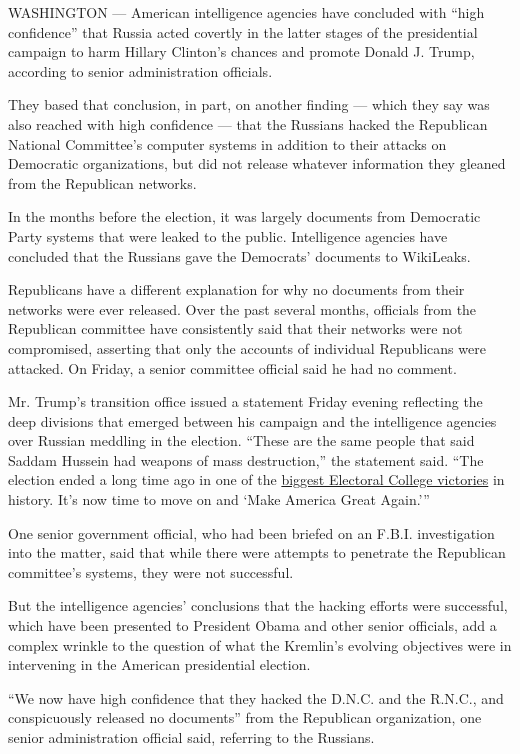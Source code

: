WASHINGTON --- American intelligence agencies have concluded with ``high
confidence'' that Russia acted covertly in the latter stages of the
presidential campaign to harm Hillary Clinton's chances and promote
Donald J. Trump, according to senior administration officials.

They based that conclusion, in part, on another finding --- which they
say was also reached with high confidence --- that the Russians hacked
the Republican National Committee's computer systems in addition to
their attacks on Democratic organizations, but did not release whatever
information they gleaned from the Republican networks.

In the months before the election, it was largely documents from
Democratic Party systems that were leaked to the public. Intelligence
agencies have concluded that the Russians gave the Democrats' documents
to WikiLeaks.

Republicans have a different explanation for why no documents from their
networks were ever released. Over the past several months, officials
from the Republican committee have consistently said that their networks
were not compromised, asserting that only the accounts of individual
Republicans were attacked. On Friday, a senior committee official said
he had no comment.

Mr. Trump's transition office issued a statement Friday evening
reflecting the deep divisions that emerged between his campaign and the
intelligence agencies over Russian meddling in the election. ``These are
the same people that said Saddam Hussein had weapons of mass
destruction,'' the statement said. ``The election ended a long time ago
in one of the
\href{http://www.politifact.com/wisconsin/statements/2016/nov/21/reince-priebus/despite-losing-popular-vote-donald-trump-won-elect/}{biggest
Electoral College victories} in history. It's now time to move on and
`Make America Great Again.'''

One senior government official, who had been briefed on an F.B.I.
investigation into the matter, said that while there were attempts to
penetrate the Republican committee's systems, they were not successful.

But the intelligence agencies' conclusions that the hacking efforts were
successful, which have been presented to President Obama and other
senior officials, add a complex wrinkle to the question of what the
Kremlin's evolving objectives were in intervening in the American
presidential election.

``We now have high confidence that they hacked the D.N.C. and the
R.N.C., and conspicuously released no documents'' from the Republican
organization, one senior administration official said, referring to the
Russians.


